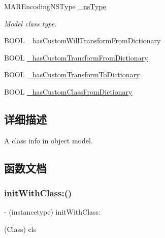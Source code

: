 \begin{DoxyCompactItemize}
M\+A\+R\+Encoding\+N\+S\+Type \hyperlink{interface___m_a_r_model_meta_a2310ec6db8b508fd0327bd52df954ea0}{\+\_\+ns\+Type}
\begin{DoxyCompactList}\small\item\em Model class type. \end{DoxyCompactList}\item 
B\+O\+OL \hyperlink{interface___m_a_r_model_meta_a0b16a403f1ff758a5051484e58b1150f}{\+\_\+has\+Custom\+Will\+Transform\+From\+Dictionary}
\item 
B\+O\+OL \hyperlink{interface___m_a_r_model_meta_afa3ec0e75a108ab24fdcde86ffc8a65c}{\+\_\+has\+Custom\+Transform\+From\+Dictionary}
\item 
B\+O\+OL \hyperlink{interface___m_a_r_model_meta_a9160e5bca83b6255e617dcaa228e22ed}{\+\_\+has\+Custom\+Transform\+To\+Dictionary}
\item 
B\+O\+OL \hyperlink{interface___m_a_r_model_meta_ad3ace5baf8bfa301be04aa0a9308c948}{\+\_\+has\+Custom\+Class\+From\+Dictionary}
\end{DoxyCompactItemize}


\subsection{详细描述}
A class info in object model. 

\subsection{函数文档}
\mbox{\label{interface___m_a_r_model_meta_a67ce54090c69f7372e1f1edf677589ec}} 
\subsubsection{\texorpdfstring{init\+With\+Class\+:()}{initWithClass:()}}
{\footnotesize\ttfamily -\/ (instancetype) init\+With\+Class\+: \begin{DoxyParamCaption}\item[{(Class)}]{cls }\end{DoxyParamCaption}\hspace{0.3cm}{\ttfamily [implementation]}}

\mbox{\label{interface___m_a_r_model_meta_a0f5be1bdc51aaf26ec0163b69b672b1e}} 
